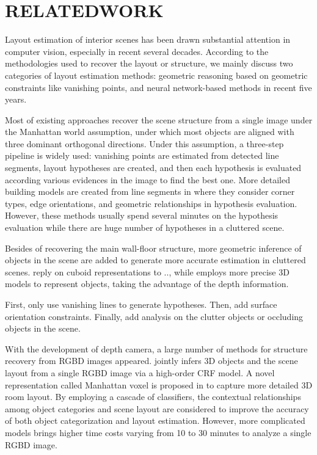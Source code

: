 \section{RELATEDWORK}
\label{sec:Rel}

Layout estimation of interior scenes has been drawn substantial attention in computer vision, especially in recent several decades. 
%
According to the methodologies used to recover the layout or structure, we mainly discuss two categories of layout estimation methods: geometric reasoning based on geometric constraints like vanishing points, and neural network-based methods in recent five years. 

%
Most of existing approaches recover the scene structure from a single image under the Manhattan world assumption, under which most objects are aligned with three dominant orthogonal directions. 
%
Under this assumption, a three-step pipeline is widely used: vanishing points are estimated from detected line segments, layout hypotheses are created, and then each hypothesis is evaluated according various evidences in the image to find the best one. 
%
%
More detailed building models are created from line segments in \cite{lee2009geometric} where they consider corner types, edge orientations, and geometric relationships in hypothesis evaluation. 
However, these methods usually spend several minutes on the hypothesis evaluation while there are huge number of hypotheses in a cluttered scene. 

Besides of recovering the main wall-floor structure, more geometric inference of objects in the scene are added to generate more accurate estimation in cluttered scenes. 
\cite{hedau2009recovering} reply on cuboid representations to .., while \cite{geiger2015joint} employs more precise 3D models to represent objects, taking the advantage of the depth information. 
%


%
First, only use vanishing lines to generate hypotheses.
Then, add surface orientation constraints. 
Finally, add analysis on the clutter objects or occluding objects in the scene.


With the development of depth camera, a large number of methods for structure recovery from RGBD images appeared. 
%
\cite{geiger2015joint} jointly infers 3D objects and the scene layout from a single RGBD image via a high-order CRF model.  
%
A novel representation called Manhattan voxel is proposed in \cite{ren2016three} to capture more detailed 3D room layout. 
By employing a cascade of classifiers, the contextual relationships among object categories and scene layout are considered to improve the accuracy of both object categorization and layout estimation. 
However, more complicated models brings higher time costs varying from 10 to 30 minutes to analyze a single RGBD image. 


